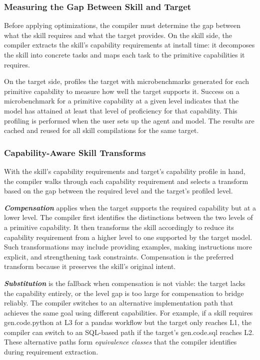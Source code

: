 \subsubsection{Measuring the Gap Between Skill and Target}

Before applying optimizations, the compiler must determine
the gap between what the skill requires and what the target
provides. On the skill side, the compiler extracts the
skill's capability requirements at install time: it
decomposes the skill into concrete tasks and maps each task
to the primitive capabilities it requires. 

On the target side, \sys profiles the target with
microbenchmarks generated for each primitive capability to
measure how well the target supports it.
Success on a microbenchmark for a primitive capability at a given level
indicates that the model has attained at least that level of proficiency for that capability.
This profiling is performed when the user sets up the agent and model.
The results are cached and reused for all skill compilations
for the same target.

\subsubsection{Capability-Aware Skill Transforms}

With the skill's capability requirements and target's capability profile in hand, the compiler
walks through each capability requirement and selects a
transform based on the gap between the required level and
the target's profiled level.

\textbf{\emph{Compensation}} applies when the target supports the
required capability but at a lower level.
The compiler first identifies the distinctions between the two levels of a primitive capability.
It then transforms the skill accordingly to reduce its capability requirement from a higher level to one supported by the target model.
Such transformations may include providing examples, making instructions more explicit, and strengthening task constraints.
Compensation is the preferred transform because it preserves the skill's original intent.

\textbf{\emph{Substitution}} is the fallback when compensation is
not viable: the target lacks the capability entirely, or the
level gap is too large for compensation to bridge reliably.
The compiler switches to an alternative
implementation path that achieves the same goal using
different capabilities. For example, if a skill requires
gen.code.python at L3 for a pandas workflow but the target
only reaches L1, the compiler can switch to an SQL-based
path if the target's gen.code.sql reaches L2. These
alternative paths form \emph{equivalence classes} that the
compiler identifies during requirement extraction.

